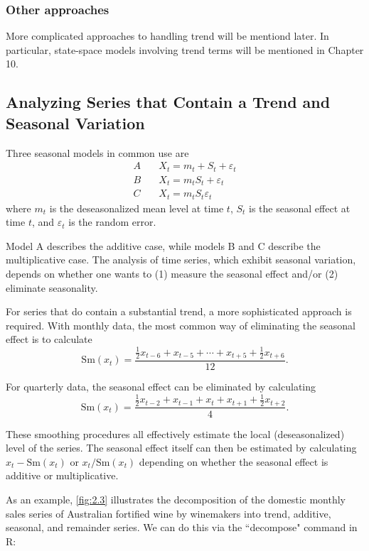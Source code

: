 \subsubsection{Other approaches}
More complicated approaches to handling trend will be mentiond later. In particular, state-space models involving trend terms will be mentioned in Chapter 10.



\subsection{Analyzing Series that Contain a Trend and Seasonal Variation}
Three seasonal models in common use are 
\begin{align*}
	A &\quad X_t = m_t + S_t + \varepsilon_t \\
	B &\quad X_t = m_t S_t + \varepsilon_t \\
	C &\quad X_t = m_t S_t \varepsilon_t
\end{align*}
where $m_t$ is the deseasonalized mean level at time $t$, $S_t$ is the seasonal effect at time $t$, and $\varepsilon_t$ is the random error.

Model A describes the additive case, while models B and C describe the multiplicative case. The analysis of time series, which exhibit seasonal variation, depends on whether one wants to (1) measure the seasonal effect and/or (2) eliminate seasonality.

For series that do contain a substantial trend, a more sophisticated approach is required. With monthly data, the most common way of eliminating the seasonal effect is to calculate 
\[ \mathrm{Sm}(x_t) = \frac{\frac{1}{2}x_{t-6} + x_{t-5} + \cdots + x_{t+5} + \frac{1}{2}x_{t+6}}{12}. \]

For quarterly data, the seasonal effect can be eliminated by calculating 
\[ \mathrm{Sm}(x_t) = \frac{\frac{1}{2}x_{t-2} + x_{t-1} + x_t + x_{t+1} + \frac{1}{2}x_{t+2}}{4}. \]

These smoothing procedures all effectively estimate the local (deseasonalized) level of the series. The seasonal effect itself can then be estimated by calculating $x_t - \mathrm{Sm}(x_t)$ or $x_t / \mathrm{Sm}(x_t)$ depending on whether the seasonal effect is additive or multiplicative.

As an example, \cref{fig:2.3} illustrates the decomposition of the domestic monthly sales series of Australian fortified wine by winemakers into trend, additive, seasonal, and remainder series. We can do this via the ``decompose" command in R:

